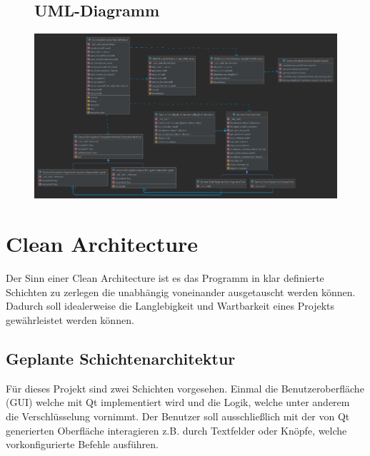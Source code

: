 \documentclass[12pt]{article}
\begin{document}
\begin{figure}
\subsection{UML-Diagramm}
	\centering
	\begin{minipage}{\textwidth}
      \includegraphics[width=\textwidth]{bilder/UML_Diagram_professionaly_edited.png}\\
   	\end{minipage}
\end{figure}
\newpage

\section{Clean Architecture}
Der Sinn einer Clean Architecture ist es das Programm in klar definierte Schichten zu zerlegen die unabhängig voneinander ausgetauscht werden können. Dadurch soll idealerweise die Langlebigkeit und Wartbarkeit eines Projekts gewährleistet werden können.

\subsection{Geplante Schichtenarchitektur}
Für dieses Projekt sind zwei Schichten vorgesehen. Einmal die Benutzeroberfläche (GUI) welche mit Qt implementiert wird und die Logik, welche unter anderem die Verschlüsselung vornimmt. Der Benutzer soll ausschließlich mit der von Qt generierten Oberfläche interagieren z.B. durch Textfelder oder Knöpfe, welche vorkonfigurierte Befehle ausführen.
\end{document}
